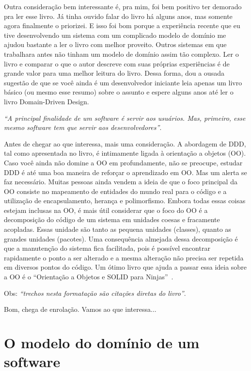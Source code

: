 \documentclass[a4paper, 12pt]{article}
\newcommand{\citacao}[1]{\emph{``#1''}}
\begin{document}
Outra consideração bem interessante é, pra mim, foi bem positivo ter demorado pra ler esse livro. Já tinha ouvido falar do livro há alguns anos, mas somente agora finalmente o priorizei. E isso foi bom porque a experiência recente que eu tive desenvolvendo um sistema com um complicado modelo de domínio me ajudou bastante a ler o livro com melhor proveito. Outros sistemas em que trabalhara antes não tinham um modelo de domínio assim tão complexo. Ler o livro e comparar o que o autor descreve com suas próprias experiências é de grande valor para uma melhor leitura do livro. Dessa forma, dou a ousada sugestão de que se você ainda é um desenvolvedor iniciante leia apenas um livro básico (ou mesmo esse resumo) sobre o assunto e espere alguns anos até ler o livro Domain-Driven Design.

\citacao{A principal finalidade de um software é servir aos usuários. Mas, primeiro, esse mesmo software tem que servir aos desenvolvedores}.

Antes de chegar ao que interessa, mais uma consideração. A abordagem de DDD, tal como apresentada no livro, é intimamente ligada à orientação a objetos (OO). Caso você ainda não domine a OO em profundamente, não se preocupe, estudar DDD é até uma boa maneira de reforçar o aprendizado em OO. Mas um alerta se faz necessário. Muitas pessoas ainda vendem a ideia de que o foco principal da OO consiste no mapeamento de entidades do mundo real para o código e a utilização de encapsulamento, herança e polimorfismo. Embora todas essas coisas estejam inclusas na OO, é mais útil considerar que o foco do OO é a decomposição do código de um sistema em unidades coesas e fracamente acopladas. Essas unidade são tanto as pequena unidades (classes), quanto as grandes unidades (pacotes). Uma consequência almejada dessa decomposição é que a manutenção do sistema fica facilitada, pois é possível encontrar rapidamente o ponto a ser alterado e a mesma alteração não precisa ser repetida em diversos pontos do código. Um ótimo livro que ajuda a passar essa ideia sobre a OO é o ``Orientação a Objetos e SOLID para Ninjas''~\cite{Aniche2015Ninjas}.

Obs: \citacao{trechos nesta formatação são citações diretas do livro}.

Bom, chega de enrolação. Vamos ao que interessa...

\section{O modelo do domínio de um software}
\end{document}
